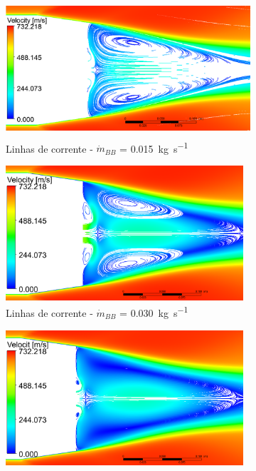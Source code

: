 \begin{figure}
    \centering
    \begin{subfigure}[b]{0.47\textwidth} %
        \centering
        \includegraphics[height=5cm,width=\textwidth]{corrente-velocidade-2306K-vazao-0015-1pol.png}
        \caption{Linhas de corrente - \(\Dot{m}_{BB}\) = \qty{0,015}{\kilogram\per\second}}
        \label{fig:corrente-velocidade-bb-1pol-vazao0015}
    \end{subfigure}
    \hfill
    \begin{subfigure}[b]{0.47\textwidth} %
        \centering
        \includegraphics[height=5cm,width=\textwidth]{corrente-velocidade-2306K-vazao-0030-1pol.png}
        \caption{Linhas de corrente - \(\Dot{m}_{BB}\) = \qty{0,030}{\kilogram\per\second}}
        \label{fig:corrente-velocidade-bb-1pol-vazao0030}
    \end{subfigure}
    \hfill
    \begin{subfigure}[b]{0.47\textwidth} %
        \centering
        \includegraphics[height=5cm,width=\textwidth]{coeficientepressao-vazao0015-temp2306-diam1pol.png}

\end{subfigure}
\end{figure}
